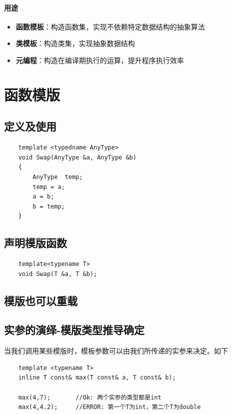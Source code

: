 \documentclass[UTF8,a4paper,12pt]{ctexbook}
\begin{document}
	\paragraph{用途}
		\begin{itemize}
			\item \textbf{函数模板}：构造函数集，实现不依赖特定数据结构的抽象算法
			\item \textbf{类模板}：构造类集，实现抽象数据结构
			\item \textbf{元编程}：构造在编译期执行的运算，提升程序执行效率
		\end{itemize}	 
		
\section{函数模版}
	\subsection{定义及使用}
			\begin{lstlisting}
	template <typedname AnyType>
	void Swap(AnyType &a, AnyType &b)
	{
		AnyType  temp;
		temp = a;
		a = b;
		b = temp;
	}			
			\end{lstlisting}
			
	\subsection{声明模版函数}
		\begin{lstlisting}			
	template<typename T>
	void Swap(T &a, T &b);			
		\end{lstlisting}
			
	\subsection{模版也可以重载}
			
	\subsection{实参的演绎-模版类型推导确定}
				
				当我们调用某些模版时，模板参数可以由我们所传递的实参来决定。如下
			\begin{lstlisting}
	template <typename T>
	inline T const& max(T const& a, T const& b);
			
	max(4,7);		//Ok: 两个实参的类型都是int
	max(4,4.2);		//ERROR: 第一个T为int，第二个T为double
			\end{lstlisting}
			
\end{document}
